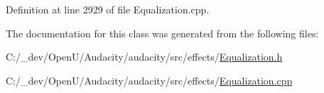 Definition at line 2929 of file Equalization.\+cpp.



The documentation for this class was generated from the following files\+:\begin{DoxyCompactItemize}
\item 
C\+:/\+\_\+dev/\+Open\+U/\+Audacity/audacity/src/effects/\hyperlink{_equalization_8h}{Equalization.\+h}\item 
C\+:/\+\_\+dev/\+Open\+U/\+Audacity/audacity/src/effects/\hyperlink{_equalization_8cpp}{Equalization.\+cpp}\end{DoxyCompactItemize}
